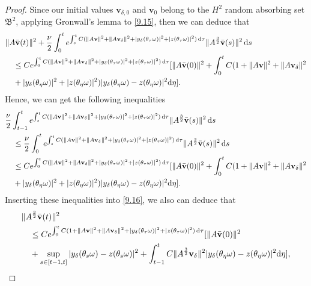 \documentclass{elsarticle}
\theoremstyle{definition}
\numberwithin{equation}{section}
\renewcommand{\d}{{\rm{d}}}
\begin{document}
\begin{proof}
Since our initial values $\textbf{v}_{\delta,0}$ and $\textbf{v}_{0}$   belong to the $H^2$ random  absorbing set  $\mathfrak B^2$,  applying Gronwall's lemma to \eqref{9.15}, then we can deduce    that
\begin{align*}
&\|A\bar{\textbf{v}}(t)\|^2+\frac{\nu}{2} \int_0^te^{\int_s^tC( \|A\textbf{v}\|^2+\|A\textbf{v}_\delta\|^2+|y_\delta(\theta_\tau\omega)|^2+|z(\theta_\tau\omega)|^2)\, \d \tau}\|A^\frac32\bar{\textbf{v}}(s)\|^2\, \d s\nonumber\\
&\quad \leq Ce^{\int_{0}^tC( \|A\textbf{v}\|^2+\|A\textbf{v}_\delta\|^2+|y_\delta(\theta_\tau\omega)|^2+|z(\theta_\tau\omega)|^2)\, \d \tau}
[\|A\bar{\textbf{v}}(0)\|^2+\int_{0}^t C(1+\|A\textbf{v}\|^2+\|A\textbf{v}_\delta\|^2\nonumber\\
&\quad +|y_\delta(\theta_\eta\omega)|^2+|z(\theta_\eta\omega)|^2
 )|y_\delta(\theta_\eta\omega)-z(\theta_\eta\omega)|^2 \d \eta].
\end{align*}
Hence, we can get the  following inequalities
\begin{align*}
& \frac{\nu}{2} \int_{t-1}^te^{\int_s^tC( \|A\textbf{v}\|^2+\|A\textbf{v}_\delta\|^2+|y_\delta(\theta_\tau\omega)|^2+|z(\theta_\tau\omega)|^2)\, \d \tau}\|A^\frac32\bar{\textbf{v}}(s)\|^2\, \d s\nonumber\\
&\quad  \leq\frac{\nu}{2} \int_0^te^{\int_s^tC( \|A\textbf{v}\|^2+\|A\textbf{v}_\delta\|^2+|y_\delta(\theta_\tau\omega)|^2+|z(\theta_\tau\omega)|^2)\, \d \tau}\|A^\frac32\bar{\textbf{v}}(s)\|^2\, \d s\nonumber\\
&\quad \leq Ce^{\int_{0}^tC( \|A\textbf{v}\|^2+\|A\textbf{v}_\delta\|^2+|y_\delta(\theta_\tau\omega)|^2+|z(\theta_\tau\omega)|^2)\, \d \tau}
[\|A\bar{\textbf{v}}(0)\|^2+\int_{0}^t C(1+\|A\textbf{v}\|^2+\|A\textbf{v}_\delta\|^2\nonumber\\
&\quad +|y_\delta(\theta_\eta\omega)|^2+|z(\theta_\eta\omega)|^2
 )|y_\delta(\theta_\eta\omega)-z(\theta_\eta\omega)|^2 \d \eta].
\end{align*}
Inserting these inequalities  into \eqref{9.16}, we also can deduce that
\begin{align*}
 &\|A^\frac32\bar{\textbf{v}}(t)\|^2\nonumber\\
&\quad \leq Ce^{\int_{0}^tC( 1+ \|A\textbf{v}\|^2+\|A\textbf{v}_\delta\|^2+|y_\delta(\theta_\tau\omega)|^2+|z(\theta_\tau\omega)|^2)\, \d \tau}
[\|A\bar{\textbf{v}}(0)\|^2\nonumber\\
&\quad+\sup\limits_{s\in[t-1,t]}|y_\delta(\theta_s\omega)-z(\theta_s\omega)|^2+\int_{t-1}^t C\|A^\frac32\textbf{v}_\delta\|^2|y_\delta(\theta_\eta\omega)-z(\theta_\eta\omega)|^2 \d \eta],

\end{align*}
\end{proof}
\end{document}
